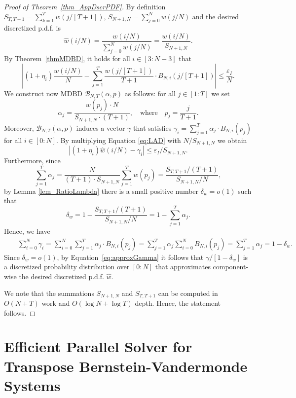 \documentclass[11pt]{article}
\newcommand{\epsI}{\eps_{I}}
\newcommand{\MDBD}{\mathrm{MDBD}}
\newcommand{\BNTap}{\mathcal{B}_{N,T}(\alpha,p)}
\newcommand{\hw}{\widehat{w}}
\newcommand{\eps}{\epsilon}
\renewcommand{\leq}{\leqslant}
\renewcommand{\eps}{\varepsilon}
\numberwithin{thm}{section}
\begin{document}
\begin{proof}[Proof of Theorem~\ref{thm_AppDscrPDF}]
By definition $S_{T,T+1}=\sum_{k=1}^{T}w(j/[T+1])$, $S_{N+1,N}=\sum_{j=0}^{N}w(j/N)$ and the desired discretized p.d.f. is
\[
\hw(i/N)=\frac{w(i/N)}{\sum_{j=0}^{N}w(j/N)}=\frac{w(i/N)}{S_{N+1,N}}.
\]
By Theorem~\ref{thmMDBD}, it holds for all $i\in\left[3:N-3\right]$ that
\begin{equation}\label{eq:LAD}
\left|\left(1+\eta_{i}\right)\frac{w(i/N)}{N} - \sum_{j=1}^{T}\frac{w(j/[T+1])}{T+1}\cdot B_{N,i}(j/[T+1])\right| \leq \frac{\epsI}{N}.
\end{equation}
We construct now $\MDBD$ $\BNTap$ as follows: for all $j\in[1:T]$ we set
\[
\alpha_{j}=\frac{w(p_{j})\cdot N}{S_{N+1,N}\cdot(T+1)},\quad\text{where}\quad p_{j}=\frac{j}{T+1}.
\]
Moreover, $\BNTap$ induces a vector $\gamma$ that satisfies $\gamma_{i}=\sum_{j=1}^{T}\alpha_{j}\cdot B_{N,i}(p_j)$ for all $i\in[0:N]$. By multiplying Equation \ref{eq:LAD} with $N/S_{N+1,N}$ we obtain
\begin{equation}\label{eq:approxGamma}
\left|\left(1+\eta_{i}\right)\hw(i/N)-\gamma_{i}\right|\leq \epsI/S_{N+1,N}.
\end{equation}
Furthermore, since
\[
\sum_{j=1}^{T}\alpha_{j} = \frac{N}{(T+1)\cdot S_{N+1,N}}\sum_{j=1}^{T}w(p_j)=\frac{S_{T,T+1}/(T+1)}{S_{N+1,N}/N},
\]
by Lemma \ref{lem_RatioLambda} there is a small positive number $\delta_w=o(1)$
such that
\[
\delta_w=1-\frac{S_{T,T+1}/(T+1)}{S_{N+1,N}/N}=1-\sum_{j=1}^{T}\alpha_{j}.
\]
Hence, we have
\begin{eqnarray*}
 &  & \sum_{i=0}^{N}\gamma_{i}=\sum_{i=0}^{N}\sum_{j=1}^{T}\alpha_{j}\cdot B_{N,i}(p_j) = \sum_{j=1}^{T}\alpha_{j}\sum_{i=0}^{N}B_{N,i}(p_j)=\sum_{j=1}^{T}\alpha_{j}=1-\delta_w.
\end{eqnarray*}
Since $\delta_w=o(1)$, by Equation~\ref{eq:approxGamma} it follows that $\gamma/[1-\delta_w]$ is a discretized probability distribution over $[0:N]$ that approximates component-wise the desired discretized p.d.f. $\hw$.

We note that the summations $S_{N+1,N}$ and $S_{T,T+1}$ can be computed in $O(N+T)$ work and $O(\log N+\log T)$ depth. Hence, the statement follows.
\end{proof}


\section{Efficient Parallel Solver for Transpose Bernstein-Vandermonde Systems}\label{sec:StBVls}
\end{document}
